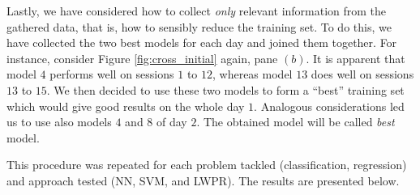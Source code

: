 Lastly, we have considered how to collect \emph{only} relevant
information from the gathered data, that is, how to sensibly reduce
the training set. To do this, we have collected the two best models
for each day and joined them together. For instance, consider Figure
\ref{fig:cross_initial} again, pane $(b)$. It is apparent that model
$4$ performs well on sessions $1$ to $12$, whereas model $13$ does
well on sessions $13$ to $15$. We then decided to use these two models
to form a ``best'' training set which would give good results on the
whole day $1$. Analogous considerations led us to use also models $4$
and $8$ of day $2$. The obtained model will be called \emph{best}
model.

This procedure was repeated for each problem tackled
(classification, regression) and approach tested (NN, SVM, and
LWPR). The results are presented below.
